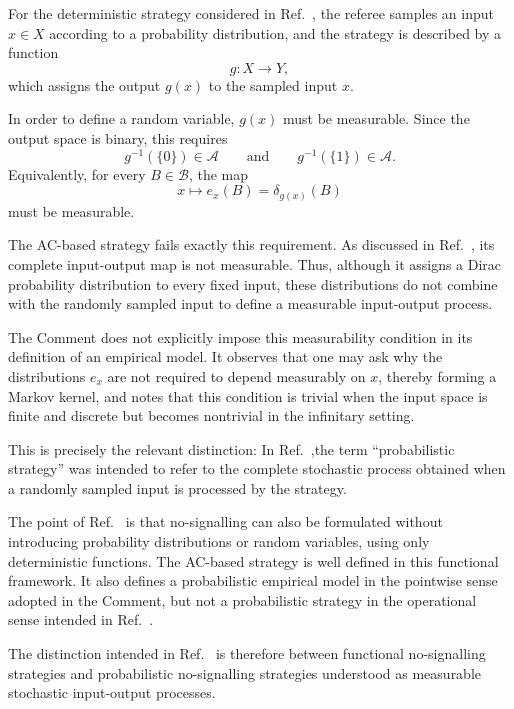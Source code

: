 \documentclass[aps,prl,twocolumn,superscriptaddress]{revtex4-2}
\begin{document}
For the deterministic strategy considered in
Ref.~\cite{baumeler2025axiom}, the referee samples an input
$x\in X$ according to a probability distribution, and the
strategy is described by a function
\begin{equation}
g:X\longrightarrow Y,
\end{equation}
which assigns the output $g(x)$ to the sampled input $x$.

In order to define a random variable, $g(x)$ must be measurable. Since the output space is binary,
this requires
\begin{equation}
g^{-1}(\{0\})\in\mathcal A
\qquad\text{and}\qquad
g^{-1}(\{1\})\in\mathcal A.
\end{equation}
Equivalently, for every $B\in\mathcal B$, the map
\begin{equation}
x\longmapsto e_x(B)
=
\delta_{g(x)}(B)
\end{equation}
must be measurable.

The AC-based strategy fails exactly this requirement. As discussed in
Ref.~\cite{baumeler2025axiom}, its complete input-output map is
not measurable. Thus, although it assigns a Dirac probability
distribution to every fixed input, these distributions do not
combine with the randomly sampled input to define a measurable
input-output process.

The Comment does not explicitly impose this measurability
condition in its definition of an empirical model. It observes
that one may ask why the distributions $e_x$ are not required to
depend measurably on $x$, thereby forming a Markov kernel, and
notes that this condition is trivial when the input space is
finite and discrete but becomes nontrivial in the infinitary
setting.

This is precisely the relevant distinction: In
Ref.~\cite{baumeler2025axiom},the term
``probabilistic strategy'' was intended to refer to the complete
stochastic process obtained when a randomly sampled input is
processed by the strategy.

The point of Ref.~\cite{baumeler2025axiom} is that no-signalling
can also be formulated without introducing probability
distributions or random variables, using only deterministic
functions. The AC-based strategy is well defined in this
functional framework. It also defines a probabilistic empirical
model in the pointwise sense adopted in the Comment, but not a
probabilistic strategy in the operational sense intended in
Ref.~\cite{baumeler2025axiom}.

The distinction intended in Ref.~\cite{baumeler2025axiom} is
therefore between functional no-signalling strategies and
probabilistic no-signalling strategies understood as measurable
stochastic input-output processes.



\end{document}
